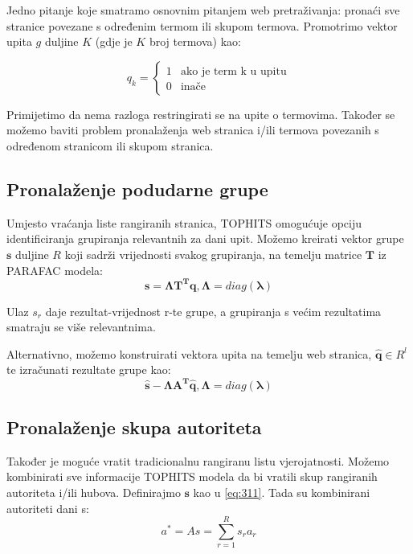 \documentclass[11pt]{article}
\begin{document}
Jedno pitanje koje smatramo osnovnim pitanjem web pretraživanja: pronaći sve stranice povezane s određenim termom ili skupom termova.
Promotrimo vektor upita $g$ duljine $K$ (gdje je $K$ broj termova) kao:


\begin{equation}
    q_{k} =  \left\{
	\begin{array}{ll}
		1  & \mbox{ako je term k u upitu} \\
		0 & \mbox{inače }
	\end{array}
\right.
\end{equation}

Primijetimo da nema razloga restringirati se na upite o termovima. Također se možemo baviti problem pronalaženja web stranica i/ili termova povezanih s određenom stranicom ili skupom stranica.

\subsection{Pronalaženje podudarne grupe}
Umjesto vraćanja liste rangiranih stranica, TOPHITS omogućuje opciju identificiranja grupiranja relevantnih za dani upit. Možemo kreirati vektor grupe $\boldsymbol{s}$ duljine $R$ koji sadrži vrijednosti svakog grupiranja, na temelju matrice $\boldsymbol{T}$ iz PARAFAC modela:
\begin{equation}\label{eq:311}
    \boldsymbol{s = \Lambda T^{T} q},  \boldsymbol{\Lambda} = diag(\boldsymbol{\lambda})
\end{equation}

Ulaz $s_r$ daje rezultat-vrijednost r-te grupe, a grupiranja s većim rezultatima smatraju se više relevantnima.

Alternativno, možemo konstruirati vektora upita na temelju web stranica, $\boldsymbol{\hat{q}} \in R^{l}$ te izračunati rezultate grupe kao:
\begin{equation}
    \boldsymbol{\hat{s} - \Lambda A^{T} \hat{q}},  \boldsymbol{\Lambda} = diag(\boldsymbol{\lambda})
\end{equation}

\subsection{Pronalaženje skupa autoriteta}
Također je moguće vratit tradicionalnu rangiranu listu vjerojatnosti. Možemo kombinirati sve informacije TOPHITS modela da bi vratili skup rangiranih autoriteta i/ili hubova.
Definirajmo $\boldsymbol{s}$ kao u \ref{eq:311}.
Tada su kombinirani autoriteti dani s:
\begin{equation}
    a^{*} = As = \sum_{r=1} ^{R} s_r a_r
\end{equation}
\end{document}
